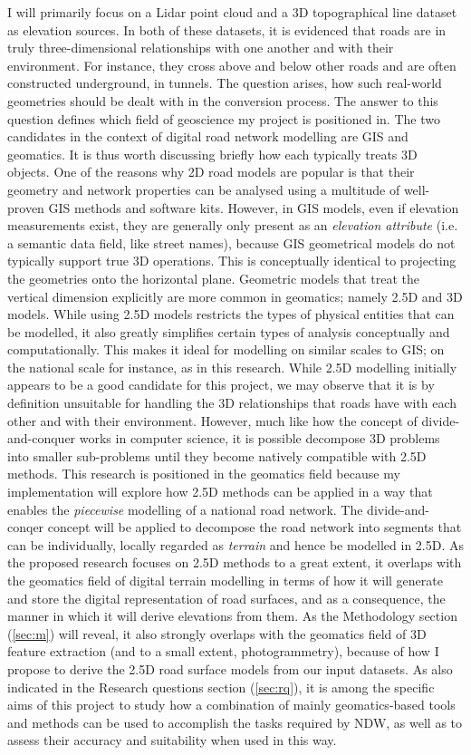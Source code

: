 I will primarily focus on a Lidar point cloud and a 3D topographical line dataset as elevation sources. In both of these datasets, it is evidenced that roads are in truly three-dimensional relationships with one another and with their environment. For instance, they cross above and below other roads and are often constructed underground, in tunnels. The question arises, how such real-world geometries should be dealt with in the conversion process. The answer to this question defines which field of geoscience my project is positioned in. The two candidates in the context of digital road network modelling are GIS and geomatics. It is thus worth discussing briefly how each typically treats 3D objects. One of the reasons why 2D road models are popular is that their geometry and network properties can be analysed using a multitude of well-proven GIS methods and software kits. However, in GIS models, even if elevation measurements exist, they are generally only present as an \textit{elevation attribute} (i.e. a semantic data field, like street names), because GIS geometrical models do not typically support true 3D operations. This is conceptually identical to projecting the geometries onto the horizontal plane. Geometric models that treat the vertical dimension explicitly are more common in geomatics; namely 2.5D and 3D models. While using 2.5D models restricts the types of physical entities that can be modelled, it also greatly simplifies certain types of analysis conceptually and computationally. This makes it ideal for modelling on similar scales to GIS; on the national scale for instance, as in this research. While 2.5D modelling initially appears to be a good candidate for this project, we may observe that it is by definition unsuitable for handling the 3D relationships that roads have with each other and with their environment. However, much like how the concept of divide-and-conquer works in computer science, it is possible decompose 3D problems into smaller sub-problems until they become natively compatible with 2.5D methods. This research is positioned in the geomatics field because my implementation will explore how 2.5D methods can be applied in a way that enables the \textit{piecewise} modelling of a national road network. The divide-and-conqer concept will be applied to decompose the road network into segments that can be individually, locally regarded as \textit{terrain} and hence be modelled in 2.5D. As the proposed research focuses on 2.5D methods to a great extent, it overlaps with the geomatics field of digital terrain modelling in terms of how it will generate and store the digital representation of road surfaces, and as a consequence, the manner in which it will derive elevations from them. As the Methodology section (\ref{sec:m}) will reveal, it also strongly overlaps with the geomatics field of 3D feature extraction (and to a small extent, photogrammetry), because of how I propose to derive the 2.5D road surface models from our input datasets. As also indicated in the Research questions section (\ref{sec:rq}), it is among the specific aims of this project to study how a combination of mainly geomatics-based tools and methods can be used to accomplish the tasks required by NDW, as well as to assess their accuracy and suitability when used in this way.

